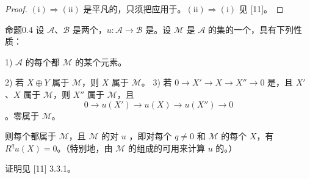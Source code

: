 \begin{proof}
$(\mathrm{i})\Rightarrow(\mathrm{ii})$ 是平凡的，只须把应用于。$(\mathrm{ii})\Rightarrow(\mathrm{i})$ 见 [11]。
\end{proof}
\begin{SGAresult}{命题}{0.4}
设 $\mathcal A$、$\mathcal B$ 是两个，$u:\mathcal A\to\mathcal B$ 是。设 $\mathcal M$ 是 $\mathcal A$ 的集的一个，具有下列性质：

1) $\mathcal A$ 的每个都 $\mathcal M$ 的某个元素。

2) 若 $X\oplus Y$ 属于 $\mathcal M$，则 $X$ 属于 $\mathcal M$。
3) 若 $0\to X'\to X\to X''\to0$ 是，且 $X'$、$X$ 属于 $\mathcal M$，则 $X''$ 属于 $\mathcal M$，且
\[
 0\longrightarrow u(X')\longrightarrow u(X)\longrightarrow u(X'')\longrightarrow0
\]
。零属于 $\mathcal M$。

则每个都属于 $\mathcal M$，且 $\mathcal M$ 的对 $u$ ，即对每个 $q\ne0$ 和 $\mathcal M$ 的每个 $X$，有 $R^qu(X)=0$。（特别地，由 $\mathcal M$ 的组成的可用来计算 $u$ 的。）
\end{SGAresult}
证明见 [11] 3.3.1。
